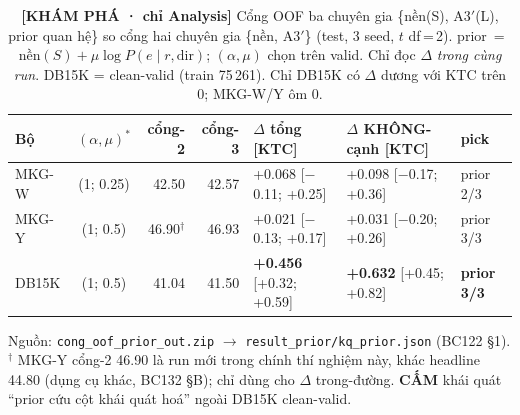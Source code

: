\begin{table}[t]
\centering
\footnotesize
\caption{\textbf{[KHÁM PHÁ · chỉ Analysis]} Cổng OOF ba chuyên gia \{nền(S), A3$'$(L),
prior quan hệ\} so cổng hai chuyên gia \{nền, A3$'$\} (test, 3 seed, $t$ df\,=\,2). prior~=~
$\text{nền}(S) + \mu\log P(e\mid r,\text{dir})$; $(\alpha,\mu)$ chọn trên valid. Chỉ đọc $\Delta$
\emph{trong cùng run}. DB15K = clean-valid (train 75\,261). Chỉ DB15K có $\Delta$ dương với
KTC trên 0; MKG-W/Y ôm 0.}
\label{tab:prior_k3}
\begin{tabular}{l c r r l l l}
\toprule
Bộ & $(\alpha,\mu)^*$ & cổng-2 & cổng-3 & $\Delta$ tổng [KTC] & $\Delta$ KHÔNG-cạnh [KTC] & pick \\
\midrule
MKG-W & (1; 0.25) & 42.50 & 42.57 & +0.068 [$-$0.11; +0.25] & +0.098 [$-$0.17; +0.36] & prior 2/3 \\
MKG-Y & (1; 0.5)  & 46.90$^\dagger$ & 46.93 & +0.021 [$-$0.13; +0.17] & +0.031 [$-$0.20; +0.26] & prior 3/3 \\
DB15K & (1; 0.5)  & 41.04 & 41.50 & \textbf{+0.456} [+0.32; +0.59] & \textbf{+0.632} [+0.45; +0.82] & \textbf{prior 3/3} \\
\bottomrule
\end{tabular}

\vspace{2pt}
\begin{minipage}{\linewidth}\footnotesize\raggedright
Nguồn: \texttt{cong\_oof\_prior\_out.zip} $\to$ \texttt{result\_prior/kq\_prior.json} (BC122 §1).
$^\dagger$ MKG-Y cổng-2 46.90 là run mới trong chính thí nghiệm này, khác headline 44.80 (dụng cụ
khác, BC132 §B); chỉ dùng cho $\Delta$ trong-đường. \textbf{CẤM} khái quát ``prior cứu cột khái
quát hoá'' ngoài DB15K clean-valid.
\end{minipage}
\end{table}
